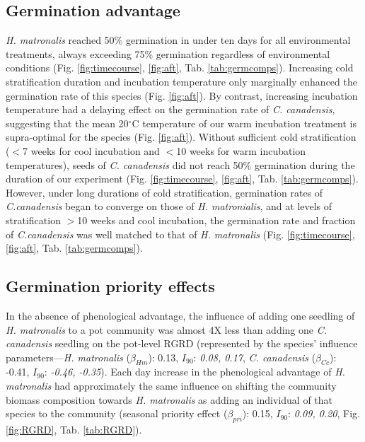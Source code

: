 \documentclass{article}[11pt]
\begin{document}
\subsection*{Germination advantage}
\textit{H. matronalis} reached 50\% germination in under ten days for all environmental treatments, always exceeding 75\% germination regardless of environmental conditions (Fig. \ref{fig:timecourse}, \ref{fig:aft}, Tab. \ref{tab:germcomps}). Increasing cold stratification duration and incubation temperature only marginally enhanced the germination rate of this species (Fig. \ref{fig:aft}). By contrast, increasing incubation temperature had a delaying effect on the germination rate of \textit{C. canadensis}, suggesting that the mean 20$^{\circ}$C temperature of our warm incubation treatment is supra-optimal for the species (Fig. \ref{fig:aft}). Without sufficient cold stratification ($<$7 weeks for cool incubation and $<$10 weeks for warm incubation temperatures), seeds of  \textit{C. canadensis} did not reach 50\% germination during the duration of our experiment (Fig. \ref{fig:timecourse}, \ref{fig:aft}, Tab. \ref{tab:germcomps}). However, under long durations of cold stratification, germination rates of \textit{C.canadensis} began to converge on those of \textit{H. matronialis}, and at levels of stratification $>$10 weeks and cool incubation, the germination rate and fraction of \textit{C.canadensis} was well matched to that of \textit{H. matronalis} (Fig. \ref{fig:timecourse}, \ref{fig:aft}, Tab. \ref{tab:germcomps}).

\subsection*{Germination priority effects}
In the absence of phenological advantage, the influence  of adding one seedling of \textit{H. matronalis} to a pot community was almost 4X less than adding one \textit{C. canadensis} seedling on the pot-level RGRD (represented by the species' influence parameters---\textit{H. matronalis} ($\beta_{Hm}$): 0.13, $I_{90}$: \textit{0.08, 0.17}, \textit{C. canadensis} ($\beta_{Cc}$): -0.41, $I_{90}$: \textit{-0.46, -0.35}). Each day increase in the phenological advantage of \textit{ H. matronalis} had approximately the same influence on shifting the community biomass composition towards \textit{H. matronalis} as adding an individual of that species to the community (seasonal priority effect ($\beta_{pri}$): 0.15, $I_{90}$: \textit{0.09, 0.20}, Fig. \ref{fig:RGRD}, Tab. \ref{tab:RGRD}).
\end{document}
